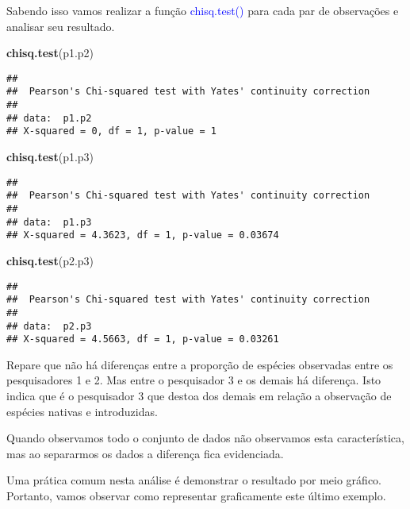 \documentclass[titlepage, oneside, openany, a4paper]{book}
\newenvironment{Shaded}{\begin{snugshade}}{\end{snugshade}}
\newcommand{\KeywordTok}[1]{\textcolor[rgb]{0.13,0.29,0.53}{\textbf{#1}}}
\newcommand{\NormalTok}[1]{#1}
\begin{document}
Sabendo isso vamos realizar a função \textcolor{blue}{chisq.test()} para cada par de observações e analisar seu resultado.

\begin{Shaded}
\begin{Highlighting}[]
\KeywordTok{chisq.test}\NormalTok{(p1.p2)}
\end{Highlighting}
\end{Shaded}

\begin{verbatim}
## 
##  Pearson's Chi-squared test with Yates' continuity correction
## 
## data:  p1.p2
## X-squared = 0, df = 1, p-value = 1
\end{verbatim}

\begin{Shaded}
\begin{Highlighting}[]
\KeywordTok{chisq.test}\NormalTok{(p1.p3)}
\end{Highlighting}
\end{Shaded}

\begin{verbatim}
## 
##  Pearson's Chi-squared test with Yates' continuity correction
## 
## data:  p1.p3
## X-squared = 4.3623, df = 1, p-value = 0.03674
\end{verbatim}

\begin{Shaded}
\begin{Highlighting}[]
\KeywordTok{chisq.test}\NormalTok{(p2.p3)}
\end{Highlighting}
\end{Shaded}

\begin{verbatim}
## 
##  Pearson's Chi-squared test with Yates' continuity correction
## 
## data:  p2.p3
## X-squared = 4.5663, df = 1, p-value = 0.03261
\end{verbatim}

Repare que não há diferenças entre a proporção de espécies observadas entre os pesquisadores 1 e 2. Mas entre o pesquisador 3 e os demais há diferença. Isto indica que é o pesquisador 3 que destoa dos demais em relação a observação de espécies nativas e introduzidas.

Quando observamos todo o conjunto de dados não observamos esta característica, mas ao separarmos os dados a diferença fica evidenciada.

Uma prática comum nesta análise é demonstrar o resultado por meio gráfico. Portanto, vamos observar como representar graficamente este último exemplo.
\end{document}
